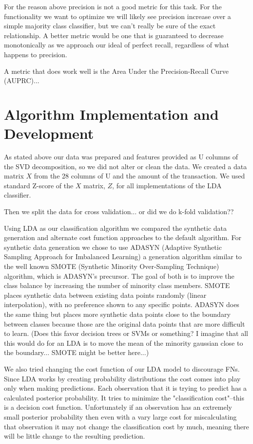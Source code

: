 \documentclass{article}
\begin{document}
For the reason above precision is not a good metric for this task.
For the functionality we want to optimize we will likely see precision increase over a simple majority class classifier, but we can't really be sure of the exact relationship.
A better metric would be one that is guaranteed to decrease monotonically as we approach our ideal of perfect recall, regardless of what happens to precision.

A metric that does work well is the Area Under the Precision-Recall Curve (AUPRC)...

\section{Algorithm Implementation and Development}

As stated above our data was prepared and features provided as U columns of the SVD decomposition, so we did not alter or clean the data.
We created a  data matrix $X$ from the 28 columns of U and the amount of the transaction.
We used standard Z-score of the $X$ matrix, $Z$, for all implementations of the LDA classifier.

Then we split the data for cross validation... or did we do k-fold validation??

Using LDA as our classification algorithm we compared the synthetic data generation and alternate cost function approaches to the default algorithm.
For synthetic data generation we chose to use ADASYN (Adaptive Synthetic Sampling Approach for Imbalanced Learning) a generation algorithm similar to the well known SMOTE (Synthetic Minority Over-Sampling Technique) algorithm, which is ADASYN's precursor.
The goal of both is to improve the class balance by increasing the number of minority class members.
SMOTE places synthetic data between existing data points randomly (linear interpolation), with no preference shown to any specific points.
ADASYN does the same thing but places more synthetic data points close to the boundary between classes because those are the original data points that are more difficult to learn.
(Does this favor decision trees or SVMs or something? I imagine that all this would do for an LDA is to move the mean of the minority gaussian close to the boundary...
SMOTE might be better here...)

We also tried changing the cost function of our LDA model to discourage FNs.
Since LDA works by creating probability distributions the cost comes into play only when making predictions.
Each observation that it is trying to predict has a calculated posterior probability.
It tries to minimize the "classification cost"--this is a decision cost function.
Unfortunately if an observation has an extremely small posterior probability then even with a vary large cost for miscalculating that observation it may not change the classification cost by much, meaning there will be little change to the resulting prediction.
\end{document}
